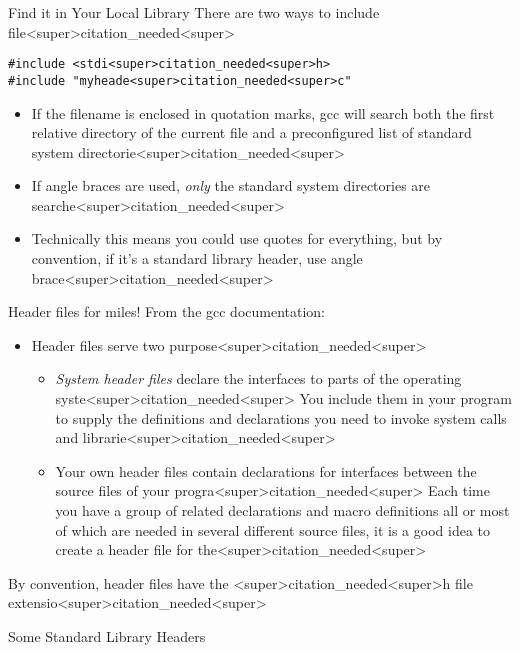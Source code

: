 \documentclass[11pt]{beamer}
\begin{document}
\begin{frame}[fragile=singleslide]{Find it in Your Local Library}
There are two ways to include file<super>citation_needed<super>
\begin{lstlisting}[style = C]
#include <stdi<super>citation_needed<super>h>
#include "myheade<super>citation_needed<super>c"
\end{lstlisting}
\begin{itemize}
\item If the filename is enclosed in quotation marks, gcc will search both the first relative directory of the current file and a preconfigured list of standard system directorie<super>citation_needed<super>
\item If angle braces are used, \emph{only} the standard system directories are searche<super>citation_needed<super>  
\item Technically this means you could use quotes for everything, but by convention, if it's a standard library header, use angle brace<super>citation_needed<super>  
\end{itemize}
\end{frame}

\begin{frame}{Header files for miles!}
From the gcc documentation:
\begin{itemize}
\item Header files serve two purpose<super>citation_needed<super> 
\begin{itemize}
\item \textit{System header files} declare the interfaces to parts of the operating syste<super>citation_needed<super> You include them in your program to supply the definitions and declarations you need to invoke system calls and librarie<super>citation_needed<super> 
\item Your own header files contain declarations for interfaces between the source files of your progra<super>citation_needed<super> Each time you have a group of related declarations and macro definitions all or most of which are needed in several different source files, it is a good idea to create a header file for the<super>citation_needed<super> 
\end{itemize}
\end{itemize}
By convention, header files have the <super>citation_needed<super>h file extensio<super>citation_needed<super>
\end{frame}

\begin{frame}{Some Standard Library Headers}
\center
\
\end{frame}
\end{document}
